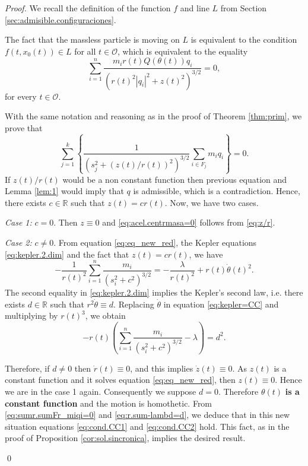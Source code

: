 \documentclass[smallcondensed]{svjour3}
\newcommand{\rr}{\mathbb{R}}
\begin{document}
\begin{proof}
 We recall the definition of the function $f$ and line $L$ from  Section \ref{sec:admisible.configuraciones}.

The fact that the massless particle is moving on $L$ is equivalent to the condition $f(t,x_0(t))\in L$ for all $t\in\mathcal{O}$,
which is equivalent to the equality
\begin{equation}\label{eq:z/r}
 \sum_{i=1}^n\frac{m_ir(t)Q(\theta (t))q_i}{\left(r(t)^2|q_i|^2+z(t)^2\right)^{3/2}}=0,
\end{equation}
for every $t\in\mathcal{O}$.

With the same notation and reasoning as in the proof of Theorem \ref{thm:prim}, we prove that
\begin{equation}\label{eq:sumr.sumFr_miqi=0}
\sum_{j=1}^k\left\{\frac{1}{(s_j^{2}+(z(t)/r(t))^2)^{3/2}}\sum_{i\in F_j}m_iq_i\right\}=0.
\end{equation}
If $z(t)/r(t)$  would be a non constant function then previous equation and Lemma \ref{lem:1} would imply that $q$ is admissible, which is a contradiction. Hence, there exists $c\in \rr$ such that $z(t)=cr(t)$. Now, we have two cases.

\emph{Case 1:} $c=0$. Then $z\equiv 0$ and \eqref{eq:acel.centrmasa=0} follows from \eqref{eq:z/r}.

\emph{Case 2:} $c\neq 0$. From equation \eqref{eq:eq_new_red}, the Kepler equations \eqref{eq:kepler.2.dim} and the fact that $z(t)=cr(t)$, we have 
\begin{equation}\label{eq:kepler=CC}
 -\frac{1}{r(t)^2}\sum_{i=1}^{n}\frac{m_i}{(s_i^2+c^2)^{3/2}}=-\frac{\lambda}{r(t)^2}+r(t)\dot{\theta}(t)^2.
\end{equation}
The second equality in \eqref{eq:kepler.2.dim} implies the Kepler's second law, i.e. there exists $d\in\rr$ such that $r^2\dot{\theta}\equiv d$. Replacing $\dot{\theta}$ in equation \eqref{eq:kepler=CC} and multiplying by $r(t)^3$, we obtain
\begin{equation}\label{eq:r.sum-lambd=d}
-r(t)\left(\sum_{i=1}^{n}\frac{m_i}{(s_i^2+c^2)^{3/2}}-\lambda\right)=d^2.
\end{equation}

Therefore, if $d\neq 0$ then $\dot{r}(t)\equiv 0$, and this implies $\dot{z}(t)\equiv 0$. As $z(t)$ is a constant function and it solves equation \eqref{eq:eq_new_red}, then $z(t)\equiv 0$. Hence we are in the case 1 again. Consequently we suppose $d=0$. Therefore $\theta(t)$ \textbf{is a constant function} and the motion is homothetic. From \eqref{eq:sumr.sumFr_miqi=0} and \eqref{eq:r.sum-lambd=d}, we deduce that in this new situation equations \eqref{eq:cond.CC1} and \eqref{eq:cond.CC2} hold. This fact, as in the proof of Proposition \ref{cor:sol.sincronica}, implies the desired result.

\qed\end{proof}
\end{document}
